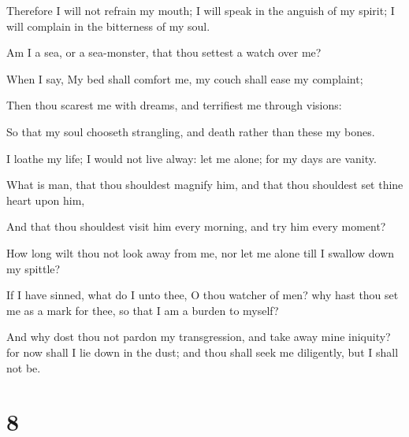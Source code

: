 \documentclass[12pt,oneside]{book}
\begin{document}
Therefore I will not refrain my mouth; I will speak in the anguish of my spirit; I will complain in the bitterness of my soul.

Am I a sea, or a sea-monster, that thou settest a watch over me?

When I say, My bed shall comfort me, my couch shall ease my complaint;

Then thou scarest me with dreams, and terrifiest me through visions:

So that my soul chooseth strangling, and death rather than these my bones.

I loathe my life; I would not live alway: let me alone; for my days are vanity.

What is man, that thou shouldest magnify him, and that thou shouldest set thine heart upon him,

And that thou shouldest visit him every morning, and try him every moment?

How long wilt thou not look away from me, nor let me alone till I swallow down my spittle?

If I have sinned, what do I unto thee, O thou watcher of men? why hast thou set me as a mark for thee, so that I am a burden to myself?

And why dost thou not pardon my transgression, and take away mine iniquity? for now shall I lie down in the dust; and thou shall seek me diligently, but I shall not be.


\chapter{8}
\end{document}
